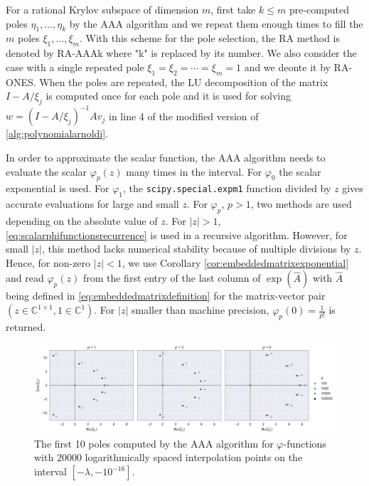 For a rational Krylov subspace of dimension $m$, first take $k \le m$ pre-computed poles $\eta_1, \dots, \eta_k$
by the AAA algorithm and we repeat them enough times to fill the $m$ poles $\xi_1, \dots, \xi_m$.
With this scheme for the pole selection, the RA method is denoted by RA-AAAk where "k" is replaced
by its number.
We also consider the case with a single repeated pole $\xi_1 = \xi_2 = \cdots = \xi_{m} = 1$ and
we deonte it by RA-ONES.
When the poles are repeated, the LU decomposition of the matrix $I - A/\xi_j$ is computed
once for each pole and it is used for solving $w = (I - A/\xi_j)^{-1} A v_j$ in line 4 of
the modified version of \autoref{alg:polynomialarnoldi}.


\begin{remark}
    In order to approximate the scalar function, the AAA algorithm needs to evaluate the scalar
    $\varphi_p(z)$ many times in the interval.
    For $\varphi_0$ the scalar exponential is used. For $\varphi_1$, the \texttt{scipy.special.expm1}
    function divided by $z$ gives accurate evaluations for large and small $z$.
    For $\varphi_p$, $p > 1$, two methods are used depending on the absolute value of $z$.
    For $|z| > 1$, \eqref{eq:scalarphifunctionsrecurrence} is used in a recursive algorithm.
    However, for small $|z|$, this method lacks numerical stability because of multiple divisions by $z$.
    Hence, for non-zero $|z| < 1$, we use Corollary \ref{cor:embeddedmatrixexponential} and read $\varphi_p(z)$
    from the first entry of the last column of $\exp(\hat{A})$ with $\hat{A}$ being defined in
    \eqref{eq:embeddedmatrixdefinition} for the matrix-vector pair
    $(z \in \mathbb{C}^{1 \times 1}, 1 \in \mathbb{C}^{1})$.
    For $|z|$ smaller than machine precision, $\varphi_p(0) = \frac{1}{p!}$ is returned.
\end{remark}

\begin{figure}[h!]
    \centering
    \includegraphics[width=.9\textwidth]{img/AAA/poles_lambda_log20k_m10.png}
    \caption{
        The first 10 poles computed by the AAA algorithm for $\varphi$-functions with $20000$
        logarithmically spaced interpolation points on the interval $[-\lambda, -10^{-16}]$.
    }
    \label{fig:polesAAA}
\end{figure}

